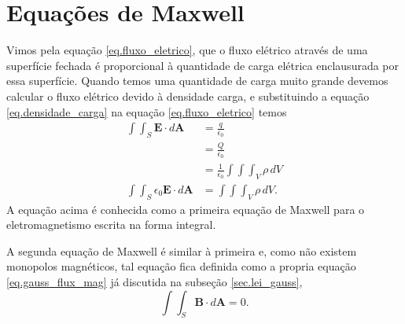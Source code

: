 \section{Equações de Maxwell}
Vimos pela equação \ref{eq.fluxo_eletrico}, que o fluxo elétrico através de uma superfície fechada é proporcional à quantidade de carga elétrica enclausurada por essa superfície. Quando temos uma quantidade de carga muito grande devemos calcular o fluxo elétrico devido à densidade carga, e substituindo a equação \ref{eq.densidade_carga} na equação \ref{eq.fluxo_eletrico} temos
\begin{align*}
\int\int_S\textbf{E}\cdot\textit{d}\textbf{A}&=\frac{q}{\epsilon_0}\\
&=\frac{Q}{\epsilon_0}\\
&=\frac{1}{\epsilon_0}\int\int\int_{V}\rho\,dV\\
\int\int_S\epsilon_0\textbf{E}\cdot\textit{d}\textbf{A}&=\int\int\int_{V}\rho\,dV.
\end{align*}
A equação acima é conhecida como a primeira equação de Maxwell para o eletromagnetismo escrita na forma integral. 


A segunda equação de Maxwell é similar à primeira e, como não existem monopolos magnéticos, tal equação fica definida como a propria equação \ref{eq.gauss_flux_mag} já discutida na subseção \ref{sec.lei_gauss},
\begin{equation*}
\int\int_S\textbf{B}\cdot\textit{d}\textbf{A}=0.
\end{equation*}


